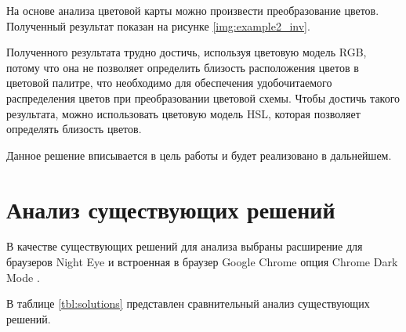 


На основе анализа цветовой карты можно произвести преобразование цветов. Полученный результат показан на рисунке \ref{img:example2_inv}.


Полученного результата трудно достичь, используя цветовую модель RGB, потому что она не позволяет определить близость расположения цветов в цветовой палитре, что необходимо для обеспечения удобочитаемого распределения цветов при преобразовании цветовой схемы. Чтобы достичь такого результата, можно использовать цветовую модель HSL, которая позволяет определять близость цветов.

Данное решение вписывается в цель работы и будет реализовано в дальнейшем.

\section{Анализ существующих решений}

В качестве существующих решений для анализа выбраны расширение для браузеров Night Eye \cite{nighteye} и встроенная в браузер Google Chrome \cite{chrome} опция Chrome Dark Mode \cite{chromedarkmode}.

В таблице \ref{tbl:solutions} представлен сравнительный анализ существующих решений.

\begin{table}[H]
	\caption{Анализ существующих решений}
	\centering
\end{table}

